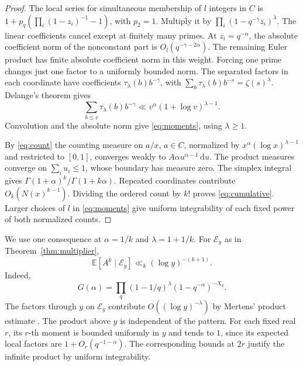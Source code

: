 \documentclass[11pt]{article}
\newcommand{\E}{\mathbb E}
\newcommand{\dd}{\,\mathrm d}
\begin{document}
\begin{proof}
The local series for simultaneous membership of \(l\) integers
in \(C\) is \(1+p_q(\prod_i(1-z_i)^{-1}-1)\), with \(p_2=1\).
Multiply it by \(\prod_i(1-q^{-\gamma}z_i)^\lambda\).
The linear coefficients cancel except at finitely many primes.
At \(z_i=q^{-\alpha}\), the absolute coefficient norm of the
nonconstant part is \(O_l(q^{-\gamma-2\alpha})\). The remaining
Euler product has finite absolute coefficient norm in this
weight. Forcing one prime changes just one factor to a uniformly
bounded norm. The separated factors in each coordinate have
coefficients \(\tau_\lambda(b)b^{-\gamma}\), with
\(\sum_b\tau_\lambda(b)b^{-s}=\zeta(s)^\lambda\).
Delange's theorem gives
\begin{equation}\label{eq:divisor}
 \sum_{b\le v}\tau_\lambda(b)b^{-\gamma}
              \ll v^\alpha(1+\log v)^{\lambda-1}.
\end{equation}
Convolution and the absolute norm give \eqref{eq:moments}, using
\(\lambda\ge1\).

By \eqref{eq:count} the counting measure on \(a/x\), \(a\in C\),
normalized by \(x^\alpha(\log x)^{\lambda-1}\) and restricted
to \([0,1]\), converges weakly to \(A\alpha u^{\alpha-1}\dd u\).
The product measures converge on \(\sum_i u_i\le1\), whose
boundary has measure zero. The simplex integral gives
\(\Gamma(1+\alpha)^k/\Gamma(1+k\alpha)\).
Repeated coordinates contribute \(O_k(N(x)^{k-1})\).
Dividing the ordered count by \(k!\) proves \eqref{eq:cumulative}.
Larger choices of \(l\) in \eqref{eq:moments} give uniform
integrability of each fixed power of both normalized counts.
\end{proof}

We use one consequence at \(\alpha=1/k\) and \(\lambda=1+1/k\).
For \(\mathcal E_y\) as in Theorem~\ref{thm:multiplier},
\begin{equation}\label{eq:smallconstant}
                  \E[A^k\mid\mathcal E_y]\ll_k(\log y)^{-(k+1)} .
\end{equation}
Indeed,
\[
 G(\alpha)=\prod_q(1-1/q)^\lambda(1-q^{-\alpha})^{-X_q}.
\]
The factors through \(y\) on \(\mathcal E_y\) contribute
\(O((\log y)^{-\lambda})\) by Mertens' product estimate
\cite[Theorems~5--8]{RS}. The product above \(y\) is independent
of the pattern. For each fixed real \(r\), its \(r\)-th moment is
bounded uniformly in \(y\) and tends to \(1\), since its expected
local factors are \(1+O_r(q^{-1-\alpha})\).
The corresponding bounds at \(2r\) justify the infinite product
by uniform integrability.
\end{document}
